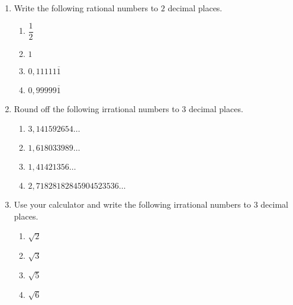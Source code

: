 \begin{eocexercises}{}
\begin{enumerate}[itemsep=5pt, label=\textbf{\arabic*}. ]

\item Write the following rational numbers to $2$ decimal places.
    \begin{enumerate}[itemsep=5pt, label=\textbf{(\alph*)} ]  
    \item $\dfrac{1}{2}$
    \item $1$
    \item $0,11111\overline{1}$
    \item $0,99999\overline{1}$
    \end{enumerate}

\item Round off the following irrational numbers to $3$ decimal places.
\begin{multicols}{2}
    \begin{enumerate}[itemsep=5pt, label=\textbf{(\alph*)} ] 
    \item $3,141592654\ldots$
    \item $1,618033989\ldots$
    \item $1,41421356\ldots$
    \item $2,71828182845904523536\ldots$
    \end{enumerate}
\end{multicols}
\item Use your calculator and write the following irrational numbers to $3$ decimal places.
\begin{multicols}{2}
    \begin{enumerate}[itemsep=5pt, label=\textbf{(\alph*)} ] 
    \item $\sqrt{2}$
    \item $\sqrt{3}$
    \item $\sqrt{5}$
    \item $\sqrt{6}$
    \end{enumerate}
\end{multicols}


\end{enumerate}
\end{eocexercises}
